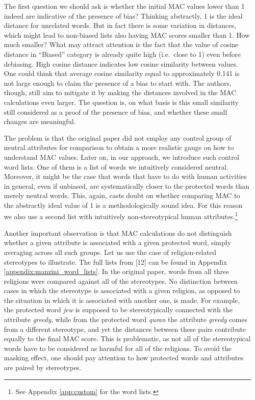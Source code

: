 \documentclass[
  12pt,
  dvipsnames,enabledeprecatedfontcommands]{scrartcl}
\begin{document}
The first question we should ask is whether the initial \textsf{MAC}
values lower than 1 indeed are indicative of the presence of bias?
Thinking abstractly, 1 is the ideal distance for unrelated words. But in
fact there is some variation in distances, which might lead to
non-biased lists also having \textsf{MAC} scores smaller than 1. How
much smaller? What may attract attention is the fact that the value of
cosine distance in ``Biased'' category is already quite high (i.e.~close
to 1) even before debiasing. High cosine distance indicates low cosine
similarity between values. One could think that average cosine
similarity equal to approximately 0.141 is not large enough to claim the
presence of a bias to start with. The authors, though, still aim to
mitigate it by making the distances involved in the \textsf{MAC}
calculations even larger. The question is, on what basis is this small
similarity still considered as a proof of the presence of bias, and
whether these small changes are meaningful.

The problem is that the original paper did not employ any control group
of neutral attributes for comparison to obtain a more realistic gauge on
how to understand \textsf{MAC} values. Later on, in our approach, we
introduce such control word lists. One of them is a list of words we
intuitively considered neutral. Moreover, it might be the case that
words that have to do with human activities in general, even if
unbiased, are systematically closer to the protected words than merely
neutral words. This, again, casts doubt on whether comparing
\textsf{MAC} to the abstractly ideal value of 1 is a methodologically
sound idea. For this reason we also use a second list with intuitively
non-stereotypical human attributes.\footnote{See Appendix
  \ref{app:custom} for the word lists.}

Another important observation is that \textsf{MAC} calculations do not
distinguish whether a given attribute is associated with a given
protected word, simply averaging across all such groups. Let us use the
case of religion-related stereotypes to illustrate. The full lists from
{[}12{]} can be found in Appendix \ref{appendix:manzini_word_lists}. In
the original paper, words from all three religions were compared against
all of the stereotypes. No distinction between cases in which the
stereotype is associated with a given religion, as opposed to the
situation in which it is associated with another one, is made. For
example, the protected word \emph{jew} is supposed to be stereotypically
connected with the attribute \emph{greedy}, while from the protected
word \emph{quran} the attribute \emph{greedy} comes from a different
stereotype, and yet the distances between these pairs contribute equally
to the final \textsf{MAC} score. This is problematic, as not all of the
stereotypical words have to be considered as harmful for all of the
religions. To avoid the masking effect, one should pay attention to how
protected words and attributes are paired by stereotypes.
\end{document}
